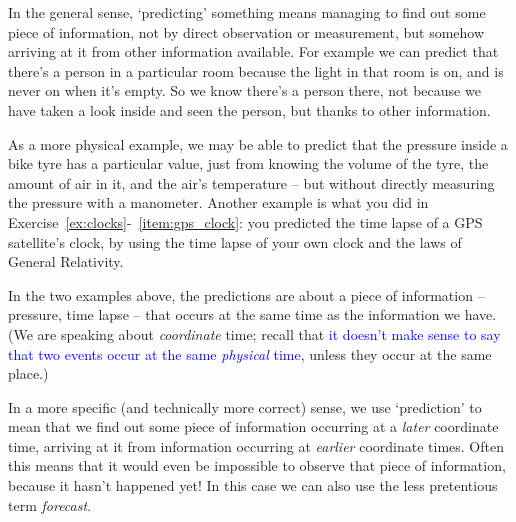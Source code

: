 \documentclass[a4paper,12pt,%
onecolumn,oneside,%
british%
]{memoir}
\renewcommand*{\|}[1][]{\nonscript\:#1\vert\nonscript\:\mathopen{}}
\newcommand*{\sect}{\S}%
\renewcommand*{\autoref}[2]{\sidepar{\vspace{-1ex}\footnotesize{\color{blue}\faIcon{%
angle-right%
}\enskip\sect~\ref{#1} page~\pageref{#1}}}\textcolor{blue}{#2}}
\begin{document}
In the general sense, \enquote*{predicting} something means managing to find out some piece of information, not by direct observation or measurement, but somehow arriving at it from other information available. For example we can predict that there's a person in a particular room because the light in that room is on, and is never on when it's empty. So we know there's a person there, not because we have taken a look inside and seen the person, but thanks to other information.

As a more physical example, we may be able to predict that the pressure inside a bike tyre has a particular value, just from knowing the volume of the tyre, the amount of air in it, and the air's temperature -- but without directly measuring the pressure with a manometer. Another example is what you did in Exercise~\ref{ex:clocks}-~\ref{item:gps_clock}: you predicted the time lapse of a GPS satellite's clock, by using the time lapse of your own clock and the laws of General Relativity.

In the two examples above, the predictions are about a piece of information -- pressure, time lapse -- that occurs at the same time as the information we have. (We are speaking about \emph{coordinate} time; recall that \autoref{sec:time}{it doesn't make sense to say that two events occur at the same \emph{physical} time}, unless they occur at the same place.)

\medskip

In a more specific (and technically more correct) sense, we use \enquote*{prediction} to mean that we find out some piece of information occurring at a \emph{later} coordinate time, arriving at it from information occurring at \emph{earlier} coordinate times. Often this means that it would even be impossible to observe that piece of information, because it hasn't happened yet! In this case we can also use the less pretentious term \emph{forecast}.
\end{document}
